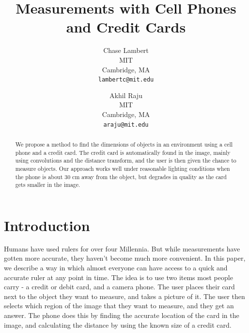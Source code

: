 \documentclass[10pt,twocolumn,letterpaper]{article}
\begin{document}
\title{Measurements with Cell Phones and Credit Cards}

\author{Chase Lambert\\
MIT\\
Cambridge, MA\\
{\tt\small lambertc@mit.edu}
\and
Akhil Raju\\
MIT\\
Cambridge, MA\\
{\tt\small araju@mit.edu}
}

\maketitle

\begin{abstract}
We propose a method to find the dimensions of objects in an environment using a cell phone and a credit card. The credit card is automatically found in the image, mainly using convolutions and the distance transform, and the user is then given the chance to measure objects. Our approach works well under reasonable lighting conditions when the phone is about 30 cm away from the object, but degrades in quality as the card gets smaller in the image.
\end{abstract}

\section{Introduction}

Humans have used rulers for over four Millennia. But while measurements have gotten more accurate, they haven’t become much more convenient. In this paper, we describe a way in which almost everyone can have access to a quick and accurate ruler at any point in time. The idea is to use two items most people carry - a credit or debit card, and a camera phone. The user places their card next to the object they want to measure, and takes a picture of it. The user then selects which region of the image that they want to measure, and they get an answer. The phone does this by finding the accurate location of the card in the image, and calculating the distance by using the known size of a credit card.
\end{document}
